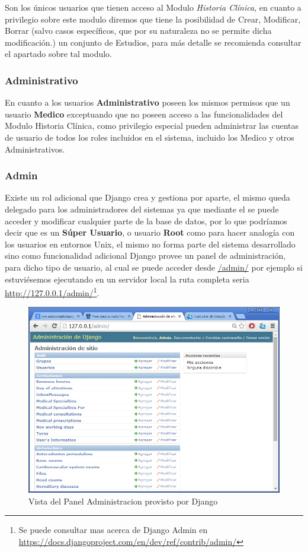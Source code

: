 Son los únicos usuarios que tienen acceso al Modulo \textit{Historia Clínica}, en cuanto a privilegio sobre este modulo diremos que tiene la posibilidad de Crear, Modificar, Borrar (salvo casos específicos, que por su naturaleza no se permite dicha modificación.) un conjunto de Estudios, para más detalle se recomienda consultar el apartado sobre tal modulo.


\subsubsection{Administrativo}

En cuanto a los usuarios \textbf{Administrativo} poseen los mismos permisos que un usuario \textbf{Medico} exceptuando que no poseen acceso a las funcionalidades del Modulo Historia Clínica, como privilegio especial pueden administrar las cuentas de usuario de todos los roles incluidos en el sistema, incluido los 
Medico y otros Administrativos.

\subsubsection{Admin}

Existe un rol adicional que Django crea y gestiona por aparte, el mismo queda delegado para los administradores del sistemas ya que mediante el se puede acceder y modificar cualquier parte de la base de datos, por lo que podríamos decir que es un \textbf{Súper Usuario}, o usuario \textbf{Root} como para hacer analogía con los usuarios en entornos Unix, el mismo no forma parte del sistema desarrollado sino como funcionalidad adicional Django provee un panel de administración, para dicho tipo de usuario, al cual se puede acceder desde \url{/admin/} por ejemplo si estuviésemos ejecutando en un servidor local la ruta completa seria \url{http://127.0.0.1/admin/}\footnote{Se puede consultar mas acerca de Django
Admin en \url{https://docs.djangoproject.com/en/dev/ref/contrib/admin/}}.\\[0.1cm]


\begin{figure}[h]
    \centering
    \includegraphics[scale=0.5]{resourse/django-admin.png}
    \caption{Vista del Panel Administracion provisto por Django}
    \label{fig:123}
\end{figure}  


